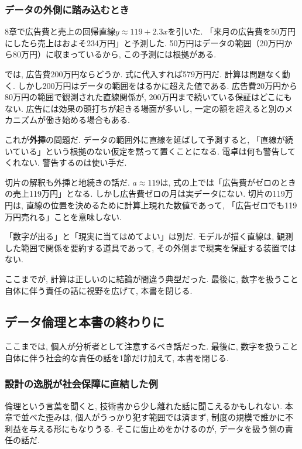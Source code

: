 \subsubsection*{データの外側に踏み込むとき}

8章で広告費と売上の回帰直線$y \approx 119 + 2.3x$を引いた.
「来月の広告費を50万円にしたら売上はおよそ234万円」と予測した.
50万円はデータの範囲（20万円から80万円）に収まっているから, この予測には根拠がある.

では, 広告費200万円ならどうか.
式に代入すれば579万円だ. 計算は問題なく動く.
しかし200万円はデータの範囲をはるかに超えた値である.
広告費20万円から80万円の範囲で観測された直線関係が, 200万円まで続いている保証はどこにもない.
広告には効果の頭打ちが起きる場面が多いし, 一定の額を超えると別のメカニズムが働き始める場合もある.

これが\textbf{外挿}の問題だ.
データの範囲外に直線を延ばして予測すると, 「直線が続いている」という根拠のない仮定を黙って置くことになる.
電卓は何も警告してくれない. 警告するのは使い手だ.

切片の解釈も外挿と地続きの話だ.
$a \approx 119$は, 式の上では「広告費がゼロのときの売上119万円」となる.
しかし広告費ゼロの月は実データにない.
切片の119万円は, 直線の位置を決めるために計算上現れた数値であって, 「広告ゼロでも119万円売れる」ことを意味しない.

「数字が出る」と「現実に当てはめてよい」は別だ.
モデルが描く直線は, 観測した範囲で関係を要約する道具であって, その外側まで現実を保証する装置ではない.

ここまでが, 計算は正しいのに結論が間違う典型だった.
最後に, 数字を扱うこと自体に伴う責任の話に視野を広げて, 本書を閉じる.


\subsection{データ倫理と本書の終わりに}

ここまでは, 個人が分析者として注意するべき話だった.
最後に, 数字を扱うこと自体に伴う社会的な責任の話を1節だけ加えて, 本書を閉じる.

\subsubsection*{設計の逸脱が社会保障に直結した例}

倫理という言葉を聞くと, 技術書から少し離れた話に聞こえるかもしれない.
本章で並べた歪みは, 個人がうっかり犯す範囲では済まず, 制度の規模で誰かに不利益を与える形にもなりうる.
そこに歯止めをかけるのが, データを扱う側の責任の話だ.

